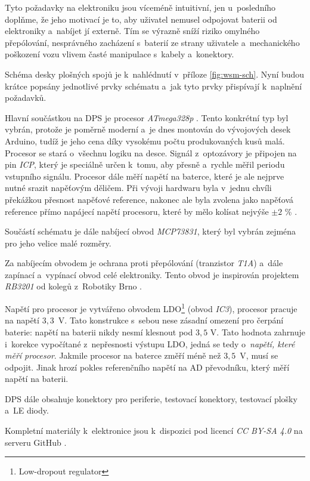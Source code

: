 Tyto požadavky na elektroniku jsou víceméně intuitivní, jen u~posledního
doplňme, že jeho motivací je to, aby uživatel nemusel odpojovat baterii od
elektroniky a~nabíjet jí externě. Tím se výrazně sníží riziko omylného
přepólování, nesprávného zacházení s~baterií ze strany uživatele a~mechanického
poškození vozu vlivem časté manipulace s~kabely a~konektory.

Schéma desky plošných spojů je k~nahlédnutí v~příloze \ref{fig:wsm-sch}. Nyní
budou krátce popsány jednotlivé prvky schématu a~jak tyto prvky přispívají
k~naplnění požadavků.

Hlavní součástkou na DPS je procesor \textit{ATmega328p}
\cite{atmega328p:datasheet}.  Tento konkrétní typ byl vybrán, protože je
poměrně moderní a~je dnes montován do vývojových desek Arduino, tudíž je jeho
cena díky vysokému počtu produkovaných kusů malá. Procesor se stará o~všechnu
logiku na desce.  Signál z~optozávory je připojen na pin \textit{ICP}, který je
speciálně určen k~tomu, aby přesně a~rychle měřil periodu vstupního signálu.
Procesor dále měří napětí na baterce, které je ale nejprve nutné srazit
napěťovým děličem. Při vývoji hardwaru byla v~jednu chvíli překážkou přesnost
napěťové reference, nakonec ale byla zvolena jako napěťová reference přímo
napájecí napětí procesoru, které by mělo kolísat nejvýše $\pm 2$ \%
\cite{ldo:datasheet}.

Součástí schématu je dále nabíjecí obvod \textit{MCP73831}, který byl vybrán
zejména pro jeho velice malé rozměry.

Za nabíjecím obvodem je ochrana proti přepólování (tranzistor \textit{T1A})
a~dále zapínací a~vypínací obvod celé elektroniky. Tento obvod je inspirován
projektem \textit{RB3201} \cite{rb3201} od kolegů z~Robotiky Brno
\cite{roboticsbrno}.

Napětí pro procesor je vytvářeno obvodem LDO\footnote{Low-dropout regulator}
(obvod \textit{IC3}), procesor pracuje na napětí $3,3$~V. Tato konstrukce
s~sebou nese zásadní omezení pro čerpání baterie: napětí na baterii nikdy nesmí
klesnout pod $3,5$ V. Tato hodnota zahrnuje i~korekce vypočítané z~nepřesnosti
výstupu LDO, jedná se tedy o~\textit{napětí, které měří procesor}. Jakmile
procesor na baterce změří méně než $3,5$~V, musí se odpojit. Jinak hrozí
pokles referenčního napětí na AD převodníku, který měří napětí na baterii.

DPS dále obsahuje konektory pro periferie, testovací konektory, testovací
plošky a~LE diody.

Kompletní materiály k~elektronice jsou k~dispozici pod licencí \textit{CC BY-SA
4.0} na serveru GitHub \cite{wsm-pcb}.

